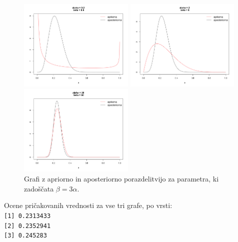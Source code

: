 \documentclass[a4paper,11pt]{article}
\begin{document}
\begin{figure}[ht!]
    \begin{minipage}{0.33\textwidth}
        \centering
        \includegraphics[width=55mm]{Slike/2_2.png}
    \end{minipage}\hfill
    \begin{minipage}{0.33\textwidth}
        \centering
        \includegraphics[width=55mm]{Slike/2_5.png}
    \end{minipage}\hfill
    \begin{minipage}{0.33\textwidth}
        \centering
        \includegraphics[width=55mm]{Slike/2_8.png}
    \end{minipage}\hfill
    \caption{Grafi z apriorno in aposteriorno porazdelitvijo za parametra, ki zadoščata  $\beta = 3 \alpha$.}
\end{figure}
\noindent
Ocene pričakovanih vrednosti za vse tri grafe, po vrsti:
\\
\texttt{[1] 0.2313433}
\\
\texttt{[2] 0.2352941}
\\
\texttt{[3] 0.245283}
\end{document}
